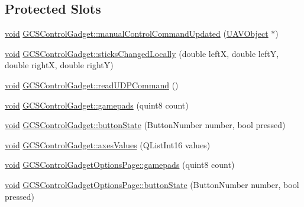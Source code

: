 \subsection*{\-Protected \-Slots}
\begin{DoxyCompactItemize}
\item 
\hyperlink{group___u_a_v_objects_plugin_ga444cf2ff3f0ecbe028adce838d373f5c}{void} \hyperlink{group___g_c_s_control_gadget_plugin_gaac625204097cbd30812c0143a80ce3ea}{\-G\-C\-S\-Control\-Gadget\-::manual\-Control\-Command\-Updated} (\hyperlink{class_u_a_v_object}{\-U\-A\-V\-Object} $\ast$)
\item 
\hyperlink{group___u_a_v_objects_plugin_ga444cf2ff3f0ecbe028adce838d373f5c}{void} \hyperlink{group___g_c_s_control_gadget_plugin_gae9a31787be607e3bf9b8b6b6a3e47983}{\-G\-C\-S\-Control\-Gadget\-::sticks\-Changed\-Locally} (double left\-X, double left\-Y, double right\-X, double right\-Y)
\item 
\hyperlink{group___u_a_v_objects_plugin_ga444cf2ff3f0ecbe028adce838d373f5c}{void} \hyperlink{group___g_c_s_control_gadget_plugin_ga69fe9e7fd531e69ac57247eb50f59874}{\-G\-C\-S\-Control\-Gadget\-::read\-U\-D\-P\-Command} ()
\item 
\hyperlink{group___u_a_v_objects_plugin_ga444cf2ff3f0ecbe028adce838d373f5c}{void} \hyperlink{group___g_c_s_control_gadget_plugin_ga1cb6abc684939d2e560ae07ca3a72cda}{\-G\-C\-S\-Control\-Gadget\-::gamepads} (quint8 count)
\item 
\hyperlink{group___u_a_v_objects_plugin_ga444cf2ff3f0ecbe028adce838d373f5c}{void} \hyperlink{group___g_c_s_control_gadget_plugin_ga515dc70507cb41b37c46ed3fd9addc47}{\-G\-C\-S\-Control\-Gadget\-::button\-State} (\-Button\-Number number, bool pressed)
\item 
\hyperlink{group___u_a_v_objects_plugin_ga444cf2ff3f0ecbe028adce838d373f5c}{void} \hyperlink{group___g_c_s_control_gadget_plugin_ga575f8651147d4a9a96a360d3ac4c600f}{\-G\-C\-S\-Control\-Gadget\-::axes\-Values} (\-Q\-List\-Int16 values)
\item 
\hyperlink{group___u_a_v_objects_plugin_ga444cf2ff3f0ecbe028adce838d373f5c}{void} \hyperlink{group___g_c_s_control_gadget_plugin_ga058f3b55102371451400fd4bea33b523}{\-G\-C\-S\-Control\-Gadget\-Options\-Page\-::gamepads} (quint8 count)
\item 
\hyperlink{group___u_a_v_objects_plugin_ga444cf2ff3f0ecbe028adce838d373f5c}{void} \hyperlink{group___g_c_s_control_gadget_plugin_gaa59744420fc5100a14c1f340a163484e}{\-G\-C\-S\-Control\-Gadget\-Options\-Page\-::button\-State} (\-Button\-Number number, bool pressed)

\end{DoxyCompactItemize}
